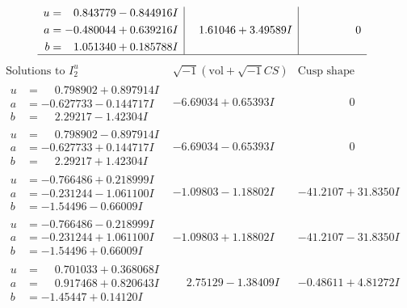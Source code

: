 \documentclass[1p]{elsarticle_modified}
\theoremstyle{definition}
\newcommand{\I}{\sqrt{-1}}
\begin{document}
$$\begin{array}{c|c|c}
\begin{aligned}
u &= \phantom{-}0.843779 - 0.844916 I \\
a &= -0.480044 + 0.639216 I \\
b &= \phantom{-}1.051340 + 0.185788 I\end{aligned}
 & \phantom{-}1.61046 + 3.49589 I & \phantom{-0.000000 } 0\\
 \hline 
 \end{array}$$\newpage$$\begin{array}{c|c|c}  
\text{Solutions to }I^u_{2}& \I (\text{vol} + \sqrt{-1}CS) & \text{Cusp shape}\\
 \hline 
\begin{aligned}
u &= \phantom{-}0.798902 + 0.897914 I \\
a &= -0.627733 - 0.144717 I \\
b &= \phantom{-}2.29217 - 1.42304 I\end{aligned}
 & -6.69034 + 0.65393 I & \phantom{-0.000000 } 0 \\ \hline\begin{aligned}
u &= \phantom{-}0.798902 - 0.897914 I \\
a &= -0.627733 + 0.144717 I \\
b &= \phantom{-}2.29217 + 1.42304 I\end{aligned}
 & -6.69034 - 0.65393 I & \phantom{-0.000000 } 0 \\ \hline\begin{aligned}
u &= -0.766486 + 0.218999 I \\
a &= -0.231244 - 1.061100 I \\
b &= -1.54496 - 0.66009 I\end{aligned}
 & -1.09803 - 1.18802 I & -41.2107 + 31.8350 I \\ \hline\begin{aligned}
u &= -0.766486 - 0.218999 I \\
a &= -0.231244 + 1.061100 I \\
b &= -1.54496 + 0.66009 I\end{aligned}
 & -1.09803 + 1.18802 I & -41.2107 - 31.8350 I \\ \hline\begin{aligned}
u &= \phantom{-}0.701033 + 0.368068 I \\
a &= \phantom{-}0.917468 + 0.820643 I \\
b &= -1.45447 + 0.14120 I\end{aligned}
 & \phantom{-}2.75129 - 1.38409 I & -0.48611 + 4.81272 I \\ \hline\begin{aligned}

\end{aligned}
\end{array}$$
\end{document}
